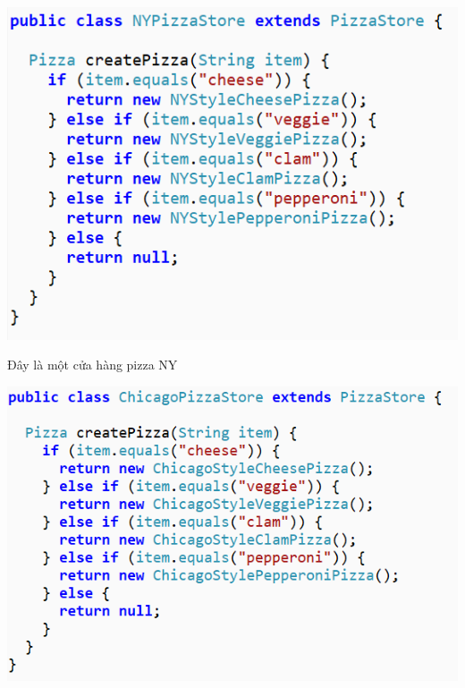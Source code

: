 \begin{center}
	\includegraphics{GALLEYS/images/chapter5/images2}
\end{center}
Đây là một cửa hàng pizza NY\\
\begin{center}
	\includegraphics{GALLEYS/images/chapter5/images3}
\end{center}
\newpage
